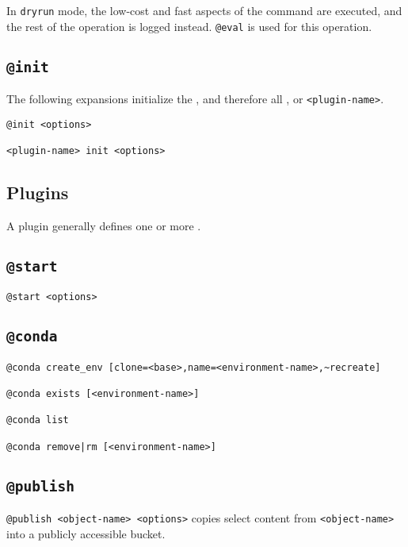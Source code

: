In \texttt{dryrun} mode, the low-cost and fast aspects of the command are executed, and the rest of the operation is logged instead. \texttt{@eval} is used for this operation. 




\subsection{\texttt{@init}}
\label{init}

The following expansions initialize the , and therefore all , or \texttt{<plugin-name>}.
%
\begin{verbatim}
@init <options>

<plugin-name> init <options>
\end{verbatim}

\subsection{Plugins}
\label{plugins}

A plugin generally defines one or more .

\subsection{\texttt{@start}}
\label{start}

\begin{verbatim}
@start <options>
\end{verbatim}

\subsection{\texttt{@conda}}
\label{conda}

\begin{verbatim}
@conda create_env [clone=<base>,name=<environment-name>,~recreate]

@conda exists [<environment-name>]

@conda list

@conda remove|rm [<environment-name>]
\end{verbatim}

\subsection{\texttt{@publish}}
\label{publish}

\texttt{@publish <object-name> <options>} copies select content from \texttt{<object-name>} into a publicly accessible bucket.


